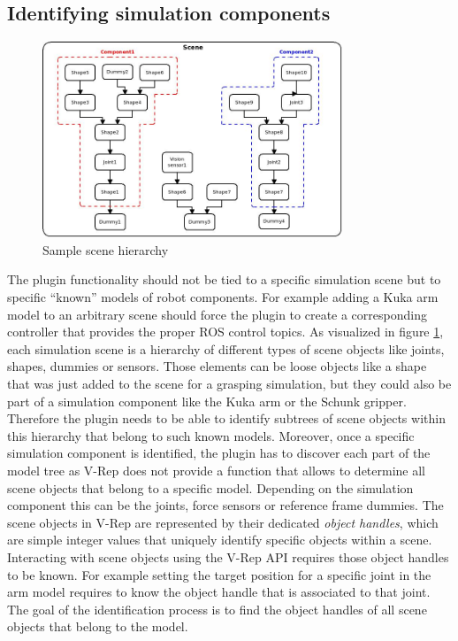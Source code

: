 \begin{itemize}
\end{itemize}

\subsection{Identifying simulation components}
\label{sec:comp_id}

\begin{figure}[h]
	\centering
  	\includegraphics[width=0.8\textwidth]{images/scene_hierarchy.jpg}
	\caption{Sample scene hierarchy}
	\label{fig:scene_tree}
\end{figure}

The plugin functionality should not be tied to a specific simulation scene but to specific ``known'' models of robot components. For example adding a Kuka arm model to an arbitrary scene should force the plugin to create a corresponding controller that provides the proper ROS control topics. As visualized in figure \ref{fig:scene_tree}, each simulation scene is a hierarchy of different types of scene objects like joints, shapes, dummies or sensors. Those elements can be loose objects like a shape that was just added to the scene for a grasping simulation, but they could also be part of a simulation component like the Kuka arm or the Schunk gripper. Therefore the plugin needs to be able to identify subtrees of scene objects within this hierarchy that belong to such known models. Moreover, once a specific simulation component is identified, the plugin has to discover each part of the model tree as V-Rep does not provide a function that allows to determine all scene objects that belong to a specific model. Depending on the simulation component this can be the joints, force sensors or reference frame dummies. The scene objects in V-Rep are represented by their dedicated \emph{object handles}, which are simple integer values that uniquely identify specific objects within a scene. Interacting with scene objects using the V-Rep API requires those object handles to be known. For example setting the target position for a specific joint in the arm model requires to know the object handle that is associated to that joint. The goal of the identification process is to find the object handles of all scene objects that belong to the model. \\

